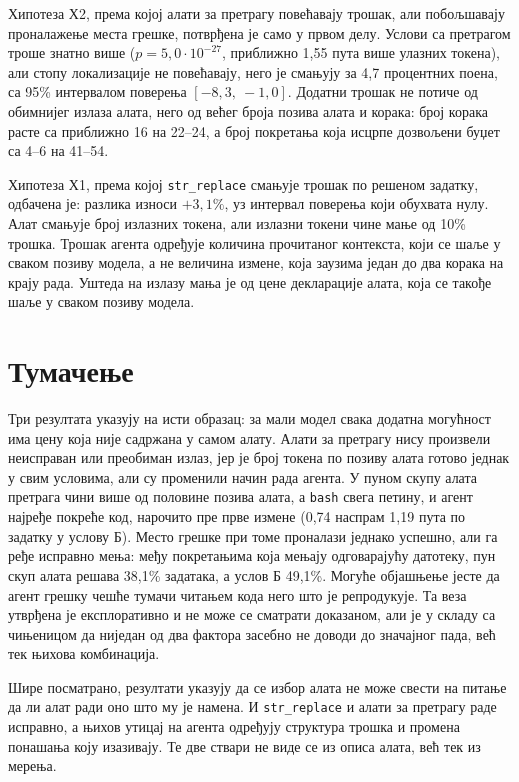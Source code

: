 \documentclass[12pt,a4paper]{report}
\begin{document}
	Хипотеза Х2, према којој алати за претрагу повећавају трошак, али побољшавају
	проналажење места грешке, потврђена је само у првом делу. Услови са
	претрагом троше знатно више ($p = 5{,}0 \cdot 10^{-27}$, приближно 1,55 пута
	више улазних токена), али стопу локализације не повећавају, него је смањују
	за 4,7 процентних поена, са 95\% интервалом поверења $[-8{,}3,\ -1{,}0]$.
	Додатни трошак не потиче од обимнијег излаза алата, него од већег броја
	позива алата и корака: број корака расте са приближно 16 на 22--24, а број
	покретања која исцрпе дозвољени буџет са 4--6 на 41--54.
	
	Хипотеза Х1, према којој \texttt{str\_replace} смањује трошак по решеном
	задатку, одбачена је: разлика износи $+3{,}1\%$, уз интервал поверења који
	обухвата нулу. Алат смањује број излазних токена, али излазни токени чине
	мање од 10\% трошка. Трошак агента одређује количина прочитаног контекста,
	који се шаље у сваком позиву модела, а не величина измене, која заузима један
	до два корака на крају рада. Уштеда на излазу мања је од цене декларације
	алата, која се такође шаље у сваком позиву модела.
	
	\section{Тумачење}
	
	Три резултата указују на исти образац: за мали модел свака додатна
	могућност има цену која није садржана у самом алату. Алати за претрагу нису
	произвели неисправан или преобиман излаз, јер је број токена по позиву
	алата готово једнак у свим условима, али су променили начин рада агента. У
	пуном скупу алата претрага чини више од половине позива алата, а
	\texttt{bash} свега петину, и агент најређе покреће код, нарочито пре прве
	измене (0,74 наспрам 1,19 пута по задатку у услову Б). Место грешке при
	томе проналази једнако успешно, али га ређе исправно мења: међу покретањима
	која мењају одговарајућу датотеку, пун скуп алата решава 38,1\% задатака, а
	услов Б 49,1\%. Могуће објашњење јесте да агент грешку чешће тумачи читањем
	кода него што је репродукује. Та веза утврђена је експлоративно и не може се
	сматрати доказаном, али је у складу са чињеницом да ниједан од два фактора
	засебно не доводи до значајног пада, већ тек њихова комбинација.
	
	Шире посматрано, резултати указују да се избор алата не може свести на
	питање да ли алат ради оно што му је намена. И \texttt{str\_replace} и алати
	за претрагу раде исправно, а њихов утицај на агента одређују структура
	трошка и промена понашања коју изазивају. Те две ствари не виде се из описа
	алата, већ тек из мерења.
	
\end{document}
